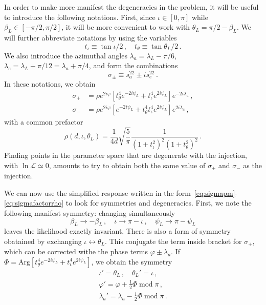 \documentclass[aps,showpacs,twocolumn,prd,superscriptaddress,nofootinbib]{revtex4-1}
\newcommand{\be}{\begin{equation}}
\newcommand{\ee}{\end{equation}}
\newcommand{\bsub}{\begin{subequations}}
\newcommand{\esub}{\end{subequations}}
\newcommand\calL{{\mathcal{L}}}
\newcommand{\nn}{\nonumber}
\newcommand\betaL{{\beta_{L}}}
\newcommand\psiL{{\psi_{L}}}
\begin{document}
In order to make more manifest the degeneracies in the problem, it will be useful to introduce the following notations. First, since $\iota \in [0, \pi]$ while $\beta_{L} \in [-\pi/2, \pi/2]$, it will be more convenient to work with $\theta_{L} = \pi/2 - \beta_{L}$. We will further abbreviate notations by using the variables
\be
	t_{\iota} \equiv \tan \iota/2 \,, \quad t_{\theta} \equiv \tan \theta_{L} / 2 \,.
\ee
We also introduce the azimuthal angles $\lambda_{a} = \lambda_{L} - \pi/6$, $\lambda_{e} = \lambda_{L} + \pi/12 = \lambda_{a} + \pi/4$, and form the combinations
\be
	\sigma_{\pm} \equiv s_{a}^{22} \pm i s_{e}^{22} \,.
\ee
In these notations, we obtain
\bsub\label{eq:sigmapm}
\begin{align}
	\sigma_{+} &= \rho e^{2i\varphi} \left[ t_{\theta}^{4} e^{-2 i \psiL} + t_{\iota}^{4} e^{2 i \psiL} \right] e^{-2i \lambda_{a}} \,, \\
	\sigma_{-} &= \rho e^{2i\varphi} \left[ e^{-2 i \psiL} + t_{\theta}^{4} t_{\iota}^{4} e^{2 i \psiL} \right] e^{2i \lambda_{a}} \,,
\end{align}
\esub
with a common prefactor
\be\label{eq:sigmafactorrho}
	\rho(d, \iota, \theta_{L}) = \frac{1}{4d} \sqrt{\frac{5}{\pi}} \frac{1}{\left( 1 + t_{\iota}^{2} \right)^{2} \left(1 + t_{\theta}^{2} \right)^{2}} \,.
\ee
Finding points in the parameter space that are degenerate with the injection, with $\ln \calL \simeq 0$, amounts to try to obtain both the same value of $\sigma_{+}$ and $\sigma_{-}$ as the injection.

We can now use the simplified response written in the form~\eqref{eq:sigmapm}-\eqref{eq:sigmafactorrho} to look for symmetries and degeneracies. First, we note the following manifest symmetry: changing simultaneously
\be\label{eq:symmetryresponse}
	\betaL \rightarrow -\betaL\,, \quad \iota \rightarrow \pi - \iota \,, \quad \psiL \rightarrow \pi - \psiL
\ee
leaves the likelihood exactly invariant. There is also a form of symmetry obatained by exchanging $\iota \leftrightarrow \theta_{L}$. This conjugate the term inside bracket for $\sigma_{+}$, which can be corrected withe the phase terms $\varphi \pm \lambda_{a}$. If $\Phi = \mathrm{Arg} \left[ t_{\theta}^{4} e^{-2 i \psiL} + t_{\iota}^{4} e^{2 i \psiL} \right]$, we obtain the symmetry
\begin{align}
	\iota' = \theta_{L} \,, \quad \theta_{L}' = \iota \,, \nn\\
	\varphi' = \varphi + \frac{1}{2} \Phi \; \mathrm{mod} \; \pi\,, \nn\\
	\lambda_{a}' = \lambda_{a} - \frac{1}{2} \Phi \; \mathrm{mod} \; \pi\,.
\end{align}
\end{document}

